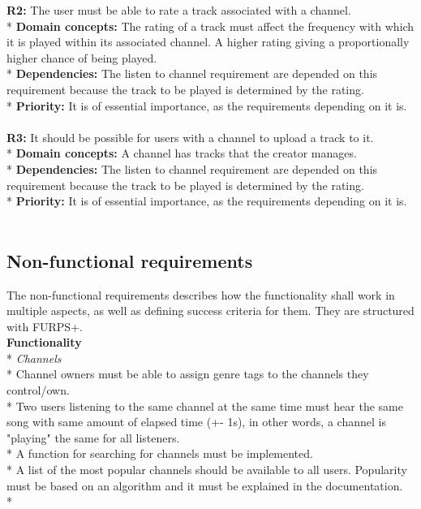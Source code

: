 \documentclass[a4paper,11pt,report]{article}
\begin{document}
\textbf{R2:}
The user must be able to rate a track associated with a channel. \\*
\textbf{Domain concepts:}
The rating of a track must affect the frequency with which it is played within its associated channel.
A higher rating giving a proportionally higher chance of being played. \\*
\textbf{Dependencies:}
The listen to channel requirement are depended on this requirement because the track to be played is determined by the rating.\\*
\textbf{Priority:}
It is of essential importance, as the requirements depending on it is.
\\ \\

\textbf{R3:}
It should be possible for users with a channel to upload a track to it. \\*
\textbf{Domain concepts:}
A channel has tracks that the creator manages. \\*
\textbf{Dependencies:}
The listen to channel requirement are depended on this requirement because the track to be played is determined by the rating.\\*
\textbf{Priority:}
It is of essential importance, as the requirements depending on it is.
 \\ \\

\subsection{Non-functional requirements}
The non-functional requirements describes how the functionality shall work in multiple aspects, as well as defining success criteria for them. They are structured with FURPS+. \\

\textbf{Functionality} \\*
\textit{Channels} \\*
Channel owners must be able to assign genre tags to the channels they control/own. \\*
Two users listening to the same channel at the same time must hear the same song with same amount of elapsed time (+- 1s), in other words, a channel is "playing" the same for all listeners. \\*
A function for searching for channels must be implemented. \\*
A list of the most popular channels should be available to all users. Popularity must be based on an algorithm and it must be explained in the documentation. \\*
\end{document}

